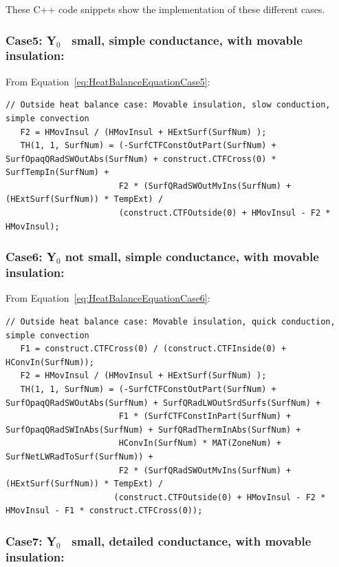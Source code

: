 These C++ code snippets show the implementation of these different cases.

\subsubsection{Case5: Y\(_{0}\)~ small, simple conductance, with movable insulation:}\label{case5-yux5f0-small-simple-conductance-with-movable-insulation-1}

From Equation~\ref{eq:HeatBalanceEquationCase5}:

\begin{lstlisting}
// Outside heat balance case: Movable insulation, slow conduction, simple convection
   F2 = HMovInsul / (HMovInsul + HExtSurf(SurfNum) );
   TH(1, 1, SurfNum) = (-SurfCTFConstOutPart(SurfNum) + SurfOpaqQRadSWOutAbs(SurfNum) + construct.CTFCross(0) * SurfTempIn(SurfNum) +
                       F2 * (SurfQRadSWOutMvIns(SurfNum) + (HExtSurf(SurfNum)) * TempExt) /
                       (construct.CTFOutside(0) + HMovInsul - F2 * HMovInsul);
\end{lstlisting}

\subsubsection{Case6: Y\(_{0}\) not small, simple conductance, with movable insulation:}\label{case6-yux5f0-not-small-simple-conductance-with-movable-insulation-1}

From Equation~\ref{eq:HeatBalanceEquationCase6}:

\begin{lstlisting}
// Outside heat balance case: Movable insulation, quick conduction, simple convection
   F1 = construct.CTFCross(0) / (construct.CTFInside(0) + HConvIn(SurfNum));
   F2 = HMovInsul / (HMovInsul + HExtSurf(SurfNum) );
   TH(1, 1, SurfNum) = (-SurfCTFConstOutPart(SurfNum) + SurfOpaqQRadSWOutAbs(SurfNum) + SurfQRadLWOutSrdSurfs(SurfNum) +
                       F1 * (SurfCTFConstInPart(SurfNum) + SurfOpaqQRadSWInAbs(SurfNum) + SurfQRadThermInAbs(SurfNum) +
                       HConvIn(SurfNum) * MAT(ZoneNum) + SurfNetLWRadToSurf(SurfNum)) +
                       F2 * (SurfQRadSWOutMvIns(SurfNum) + (HExtSurf(SurfNum)) * TempExt) /
                      (construct.CTFOutside(0) + HMovInsul - F2 * HMovInsul - F1 * construct.CTFCross(0));
\end{lstlisting}

\subsubsection{Case7: Y\(_{0}\)~ small, detailed conductance, with movable insulation:}\label{case7-yux5f0-small-detailed-conductance-with-movable-insulation-1}

